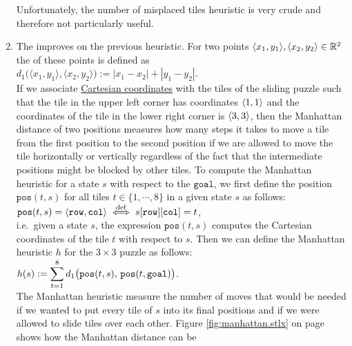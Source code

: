 \begin{enumerate}
      Unfortunately, the number of misplaced tiles heuristic is very crude and therefore not
      particularly useful.
\item The  improves on the previous heuristic.  For two points
      $\pair(x_1, y_1), \pair(x_2, y_2) \in \mathbb{R}^2$ the  of these
      points is defined as
      \\[0.2cm]
      \hspace*{1.3cm}
      $d_1\bigl(\langle x_1, y_1\rangle, \langle x_2, y_2\rangle\bigr) := |x_1 - x_2| + |y_1 - y_2|$.
      \\[0.2cm]
      If we associate \href{https://en.wikipedia.org/wiki/Cartesian_coordinate_system}{Cartesian coordinates} with
      the tiles of the sliding puzzle such that the tile in the upper left corner has coordinates
      $\pair(1, 1)$ and the coordinates of the tile in the lower right corner is $\pair(3, 3)$, then
      the Manhattan distance of two positions measures how many steps it takes to move a tile from
      the first position to the second position if we are allowed to move the tile horizontally
      or vertically regardless of the fact that the intermediate positions might be blocked by
      other tiles.  To compute the Manhattan heuristic for a state $s$ with respect to the
      $\mathtt{goal}$, we first define the position $\mathtt{pos}(t, s)$ for all tiles
      $t \in \{1,\cdots, 8\}$ in a given state $s$ as follows:
      \\[0.2cm]
      \hspace*{1.3cm}
      $\mathtt{pos}(t, s) = \pair(\mathtt{row}, \mathtt{col})
         \;\stackrel{\mathrm{def}}{\Longleftrightarrow}\; s[\mathtt{row}][\mathtt{col}] = t
      $,
      \\[0.2cm]
      i.e.~given a state $s$, the expression $\mathtt{pos}(t, s)$ computes the Cartesian coordinates of
      the tile $t$ with respect to $s$.  Then we can define the Manhattan heuristic $h$ for the $3 \times 3$ puzzle
      as follows:
      \\[0.2cm]
      \hspace*{1.3cm}
      $\displaystyle h(s) := \sum\limits_{t=1}^8 d_1\bigl(\mathtt{pos}(t,s),\, \mathtt{pos}(t, \mathtt{goal})\bigr)$.
      \\[0.2cm]
      The Manhattan heuristic measure the number of moves that would be needed if we wanted to put every tile
      of $s$ into its final positions and if we were allowed to slide tiles over each other.  Figure
      \ref{fig:manhattan.stlx} on page \pageref{fig:manhattan.stlx} shows how the Manhattan distance can be

\end{enumerate}
